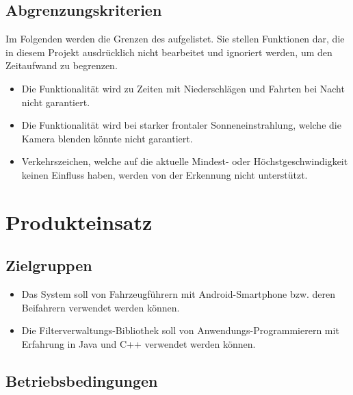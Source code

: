 \documentclass[12pt,a4paper,ngerman,enabledeprecatedfontcommands]{scrreprt}
\begin{document}
\section{Abgrenzungskriterien}
Im Folgenden werden die Grenzen des  aufgelistet. Sie stellen Funktionen dar, die in diesem Projekt ausdrücklich nicht bearbeitet und ignoriert werden, um den Zeitaufwand zu begrenzen.
\begin{itemize}
    \item Die Funktionalität wird zu Zeiten mit Niederschlägen und Fahrten bei Nacht nicht garantiert.
    \item Die Funktionalität wird bei starker frontaler Sonneneinstrahlung, welche die Kamera blenden könnte nicht garantiert.
    \item Verkehrszeichen, welche auf die aktuelle Mindest- oder Höchstgeschwindigkeit keinen Einfluss haben, werden von der Erkennung nicht unterstützt.
\end{itemize}

\chapter{Produkteinsatz}
\label{chap:produkteinsatz}

\section{Zielgruppen}
\begin{itemize}
\item Das \gls{System} soll von Fahrzeugführern mit Android-\gls{Smartphone} bzw. deren Beifahrern verwendet werden können.

\item Die \gls{Filterverwaltungs-Bibliothek} soll von Anwendungs-Programmierern mit Erfahrung in Java und C++ verwendet werden können.
\end{itemize}

\section{Betriebsbedingungen}
\label{sec:betriebsbedingungen}
\end{document}

